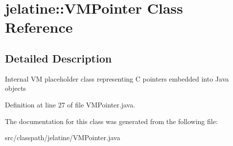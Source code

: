 \section{jelatine::VMPointer Class Reference}
\label{classjelatine_1_1_v_m_pointer}


\subsection{Detailed Description}
Internal VM placeholder class representing C pointers embedded into Java objects 

Definition at line 27 of file VMPointer.java.



The documentation for this class was generated from the following file:\begin{DoxyCompactItemize}
\item 
src/classpath/jelatine/VMPointer.java\end{DoxyCompactItemize}
